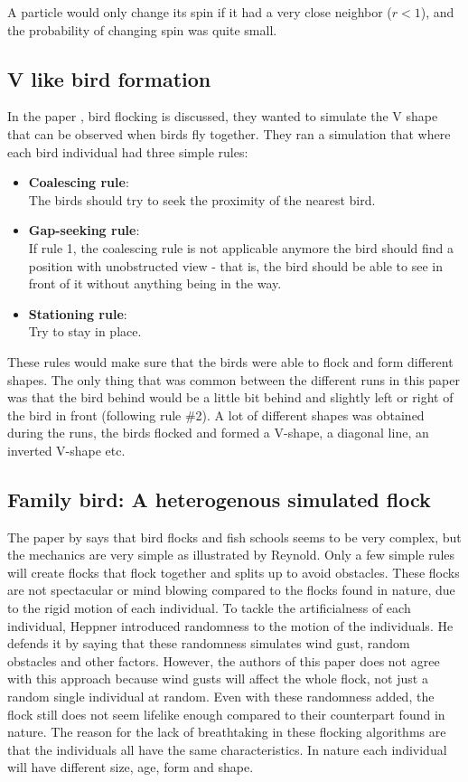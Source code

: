 A particle would only change its spin if it had a very close neighbor ($r<1$), and the probability of changing spin was quite small.

\subsection{V like bird formation}
In the paper \citep{Nathan2008}, bird flocking is discussed, they wanted to simulate the V shape that can be observed when birds fly together. They ran a simulation that where each bird individual had three simple rules: 
\begin{itemize}
    \item \textbf{Coalescing rule}: \\
        The birds should try to seek the proximity of the nearest bird.
    \item \textbf{Gap-seeking rule}: \\
        If rule 1, the coalescing rule is not applicable anymore the bird should find a position with unobstructed view -  that is, the bird should be able to see in front of it without anything being in the way.
    \item \textbf{Stationing rule}: \\
        Try to stay in place.
\end{itemize}
These rules would make sure that the birds were able to flock and form different shapes. The only thing that was common between the different runs in this paper was that the bird behind would be a little bit behind and slightly left or right of the bird in front (following rule \#2). A lot of different shapes was obtained during the runs, the birds flocked and formed a V-shape, a diagonal line, an inverted V-shape etc.

\subsection{Family bird: A heterogenous simulated flock}
The paper \citep{Demsar2013} by \citeauthor{Demsar2013} says that bird flocks and fish schools seems to be very complex, but the mechanics are very simple as illustrated by Reynold. Only a few simple rules will create flocks that flock together and splits up to avoid obstacles. These flocks are not spectacular or mind blowing compared to the flocks found in nature, due to the rigid motion of each individual. To tackle the artificialness of each individual, Heppner introduced randomness to the motion of the individuals. He defends it by saying that these randomness simulates wind gust, random obstacles and other factors. 
However, the authors of this paper does not agree with this approach because wind gusts will affect the whole flock, not just a random single individual at random. Even with these randomness added, the flock still does not seem lifelike enough compared to their counterpart found in nature. The reason for the lack of breathtaking in these flocking algorithms are that the individuals all have the same characteristics. In nature each individual will have different size, age, form and shape.
 
